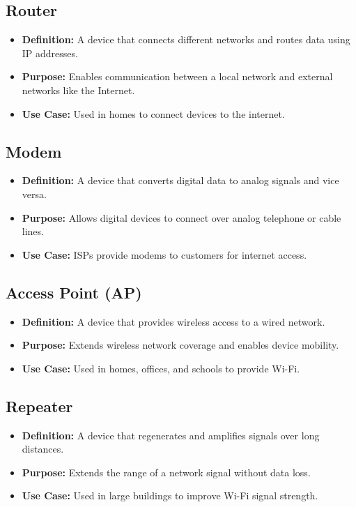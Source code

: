 \subsection{Router}
\begin{itemize}[leftmargin=1.5cm]
  \item \textbf{Definition:} A device that connects different networks and routes data using IP addresses.
  \item \textbf{Purpose:} Enables communication between a local network and external networks like the Internet.
  \item \textbf{Use Case:} Used in homes to connect devices to the internet.
\end{itemize}

\subsection{Modem}
\begin{itemize}[leftmargin=1.5cm]
  \item \textbf{Definition:} A device that converts digital data to analog signals and vice versa.
  \item \textbf{Purpose:} Allows digital devices to connect over analog telephone or cable lines.
  \item \textbf{Use Case:} ISPs provide modems to customers for internet access.
\end{itemize}

\subsection{Access Point (AP)}
\begin{itemize}[leftmargin=1.5cm]
  \item \textbf{Definition:} A device that provides wireless access to a wired network.
  \item \textbf{Purpose:} Extends wireless network coverage and enables device mobility.
  \item \textbf{Use Case:} Used in homes, offices, and schools to provide Wi-Fi.
\end{itemize}

\subsection{Repeater}
\begin{itemize}[leftmargin=1.5cm]
  \item \textbf{Definition:} A device that regenerates and amplifies signals over long distances.
  \item \textbf{Purpose:} Extends the range of a network signal without data loss.
  \item \textbf{Use Case:} Used in large buildings to improve Wi-Fi signal strength.
\end{itemize}

